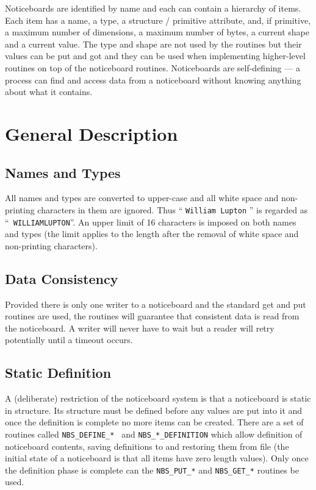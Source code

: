       Noticeboards are identified by name and each can contain a hierarchy of
      items. Each item has a name, a type, a structure / primitive attribute,
      and, if primitive, a maximum number of dimensions, a maximum number of
      bytes, a current shape and a current value. The type and shape are not
      used by the routines but their values can be put and got and they can be
      used when implementing higher-level routines on top of the noticeboard
      routines. Noticeboards are self-defining --- a process can find and access
      data from a noticeboard without knowing anything about what it contains.

      \section {General Description}
      \subsection {Names and Types} All names and types are converted to
      upper-case and all white space and non-printing characters in them are
      ignored. Thus `` {\tt William Lupton} '' is regarded as ``{\tt%
WILLIAMLUPTON}''. An
      upper limit of 16 characters is imposed on both names and types (the
      limit applies to the length after the removal of white space and
      non-printing characters).

      \subsection {Data Consistency} Provided there is only one writer to a
      noticeboard and the standard get and put routines are used, the routines
      will guarantee that consistent data is read from the noticeboard. A
      writer will never have to wait but a reader will retry potentially until
      a timeout occurs.

      \subsection {Static Definition} A (deliberate) restriction of the
      noticeboard system is that a noticeboard is static in structure. Its
      structure must be defined before any values are put into it and once the
      definition is complete no more items can be created. There are a set of
      routines called {\tt NBS\_DEFINE\_* } and {\tt NBS\_*\_DEFINITION}
      which allow definition
      of noticeboard contents, saving definitions to and restoring them from
      file (the initial state of a noticeboard is that all items have zero
      length values). Only once the definition phase is complete can the
      {\tt NBS\_PUT\_*} and {\tt NBS\_GET\_*} routines be used.

